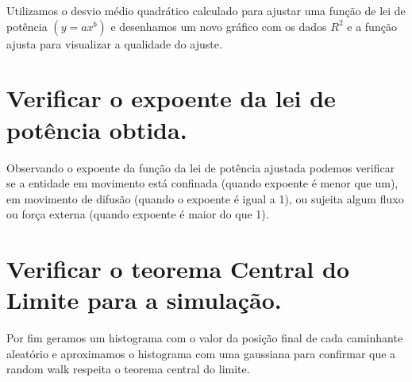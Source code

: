 Utilizamos o desvio médio quadrático calculado para ajustar uma função de lei de potência $(y = ax^{b})$ e desenhamos um novo gráfico com os dados $R^{2}$ e a função ajusta para visualizar a qualidade do ajuste. 

\section{Verificar o expoente da lei de potência obtida.}
\label{sec_5}

Observando o expoente da função da lei de potência ajustada podemos verificar se a entidade em movimento está confinada (quando expoente é menor que um), em movimento de difusão (quando o expoente é igual a 1), ou sujeita algum fluxo ou força externa (quando expoente é maior do que 1).

\section{Verificar o teorema Central do Limite para a simulação.}
\label{sec_6}

Por fim geramos um histograma com o valor da posição final de cada caminhante aleatório e aproximamos o histograma com uma gaussiana para confirmar que a random walk respeita o teorema central do limite.